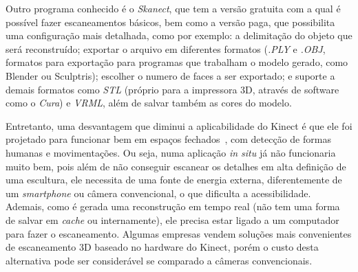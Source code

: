 Outro programa conhecido é o \emph{Skanect}, que tem a versão gratuita com a qual é possível fazer escaneamentos
básicos, bem como a versão paga, que possibilita uma configuração mais
detalhada, como por
exemplo: a delimitação do objeto que será reconstruído; exportar o arquivo em
diferentes formatos (\emph{.PLY} e \emph{.OBJ}, formatos para exportação para
programas que trabalham o modelo gerado, como Blender ou Sculptris);
escolher o numero de faces a ser exportado; e suporte a demais formatos como
\emph{STL} (próprio para a impressora 3D, através de software como o \emph{Cura})
e \emph{VRML}, além de salvar também as cores do modelo.

Entretanto, uma desvantagem que diminui a aplicabilidade do Kinect é que ele foi
projetado para funcionar bem em espaços fechados~\cite{schmid2013stereo}, com detecção de formas humanas
e movimentações. Ou seja, numa aplicação \emph{in situ} já não funcionaria muito
bem, pois além de não conseguir escanear os detalhes em alta definição de uma
escultura, ele necessita de uma fonte de energia externa, diferentemente de um
\emph{smartphone} ou câmera convencional, o que dificulta a acessibilidade.
Ademais, como é gerada uma reconstrução em tempo real (não tem uma forma de salvar em
\emph{cache} ou internamente), ele precisa estar ligado a um computador para fazer o escaneamento.
Algumas empresas vendem soluções mais convenientes de escaneamento 3D baseado no
hardware do Kinect, porém o custo desta alternativa pode ser considerável se
comparado a câmeras convencionais.


